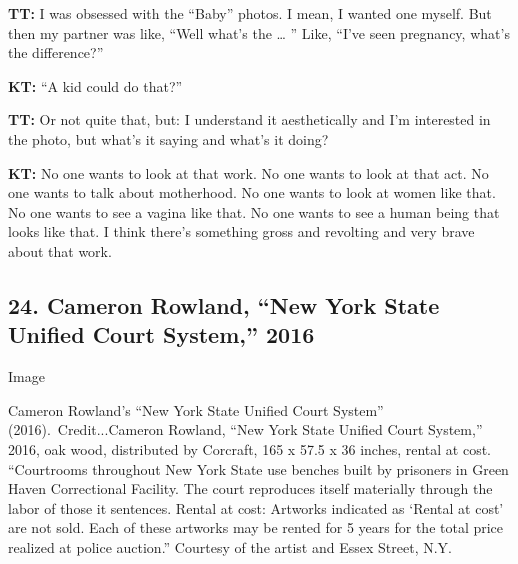 \textbf{TT:} I was obsessed with the ``Baby'' photos. I mean, I wanted
one myself. But then my partner was like, ``Well what's the \ldots{} ''
Like, ``I've seen pregnancy, what's the difference?''

\textbf{KT:} ``A kid could do that?''

\textbf{TT:} Or not quite that, but: I understand it aesthetically and
I'm interested in the photo, but what's it saying and what's it doing?

\textbf{KT:} No one wants to look at that work. No one wants to look at
that act. No one wants to talk about motherhood. No one wants to look at
women like that. No one wants to see a vagina like that. No one wants to
see a human being that looks like that. I think there's something gross
and revolting and very brave about that work.

\hypertarget{24-cameron-rowland-new-york-state-unified-court-system-2016}{%
\subsection{24. Cameron Rowland, ``New York State Unified Court
System,''
2016}\label{24-cameron-rowland-new-york-state-unified-court-system-2016}}

Image

Cameron Rowland's ``New York State Unified Court System''
(2016).~Credit...Cameron Rowland, ``New York State Unified Court
System,'' 2016, oak wood, distributed by Corcraft, 165 x 57.5 x 36
inches, rental at cost. ``Courtrooms throughout New York State use
benches built by prisoners in Green Haven Correctional Facility. The
court reproduces itself materially through the labor of those it
sentences. Rental at cost: Artworks indicated as `Rental at cost' are
not sold. Each of these artworks may be rented for 5 years for the total
price realized at police auction.'' Courtesy of the artist and Essex
Street, N.Y.

